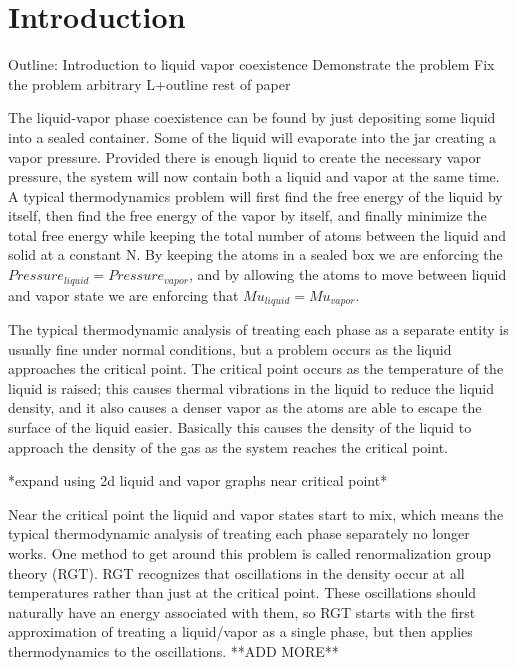 \section{Introduction}

Outline:
Introduction to liquid vapor coexistence
Demonstrate the problem
Fix the problem
arbitrary L+outline rest of paper

The liquid-vapor phase coexistence can be found by just depositing some liquid into a sealed container. Some of the liquid will evaporate into the jar creating a vapor pressure. Provided there is enough liquid to create the necessary vapor pressure, the system will now contain both a liquid and vapor at the same time. A typical thermodynamics problem will first find the free energy of the liquid by itself, then find the free energy of the vapor by itself, and finally minimize the total free energy while keeping the total number of atoms between the liquid and solid at a constant N. By keeping the atoms in a sealed box we are enforcing the $Pressure_{liquid}=Pressure_{vapor}$, and by allowing the atoms to move between liquid and vapor state we are enforcing that $Mu_{liquid}=Mu_{vapor}$.

The typical thermodynamic analysis of treating each phase as a separate entity is usually fine under normal conditions, but a problem occurs as the liquid approaches the critical point. The critical point occurs as the temperature of the liquid is raised; this causes thermal vibrations in the liquid to reduce the liquid density, and it also causes a denser vapor as the atoms are able to escape the surface of the liquid easier. Basically this causes the density of the liquid to approach the density of the gas as the system reaches the critical point.

*expand using 2d liquid and vapor graphs near critical point*

Near the critical point the liquid and vapor states start to mix, which means the typical thermodynamic analysis of treating each phase separately no longer works. One method to get around this problem is called renormalization group theory (RGT). RGT recognizes that oscillations in the density occur at all temperatures rather than just at the critical point. These oscillations should naturally have an energy associated with them, so RGT starts with the first approximation of treating a liquid/vapor as a single phase, but then applies thermodynamics to the oscillations. **ADD MORE**

